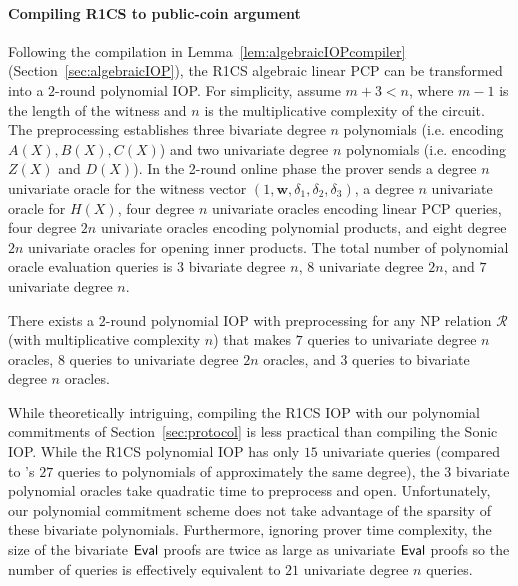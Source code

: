 \paragraph{Compiling R1CS to public-coin argument} 

Following the compilation in Lemma~\ref{lem:algebraicIOPcompiler} (Section~\ref{sec:algebraicIOP}), the R1CS algebraic linear PCP can be transformed into a $2$-round polynomial IOP. For simplicity, assume $m+3 < n$, where $m-1$ is the length of the witness and $n$ is the multiplicative complexity of the circuit. The preprocessing establishes three bivariate degree $n$ polynomials (i.e. encoding $A(X), B(X), C(X)$) and two univariate degree $n$ polynomials (i.e. encoding $Z(X)$ and $D(X)$). In the 2-round online phase the prover sends a degree $n$ univariate oracle for the witness vector $(1, \mathbf{w}, \delta_1, \delta_2, \delta_3)$, a degree $n$ univariate oracle for $H(X)$, four degree $n$ univariate oracles encoding linear PCP queries, four degree $2n$ univariate oracles encoding polynomial products, and eight degree $2n$ univariate oracles for opening inner products. The total number of polynomial oracle evaluation queries is $3$ bivariate degree $n$, $8$ univariate degree $2n$, and $7$ univariate degree $n$.

\begin{theorem}
There exists a $2$-round polynomial IOP with preprocessing for any NP relation $\mathcal{R}$ (with multiplicative complexity $n$) that makes $7$ queries to univariate degree $n$ oracles, $8$ queries to univariate degree $2n$ oracles, and $3$ queries to bivariate degree $n$ oracles.  
\end{theorem}
 
While theoretically intriguing, compiling the R1CS IOP with our polynomial commitments of Section~\ref{sec:protocol} is less practical than compiling the \textsf{Sonic} IOP. While the R1CS polynomial IOP has only $15$ univariate queries (compared to 's $27$ queries to polynomials of approximately the same degree), the $3$ bivariate polynomial oracles take quadratic time to preprocess and open. Unfortunately, our polynomial commitment scheme does not take advantage of the sparsity of these bivariate polynomials. Furthermore, ignoring prover time complexity, the size of the bivariate $\textsf{{Eval}}$ proofs are twice as large as univariate $\textsf{{Eval}}$ proofs so the number of queries is effectively equivalent to $21$ univariate degree $n$ queries. 




